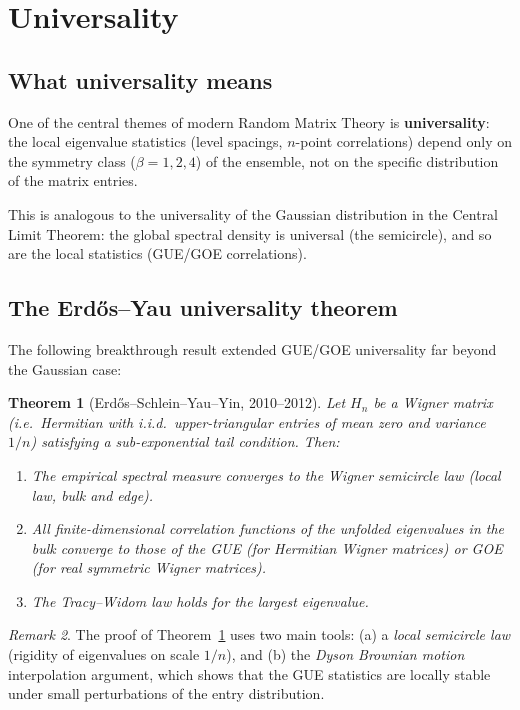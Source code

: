 \documentclass[12pt,a4paper]{amsart}
\newtheorem{theorem}{Theorem}[section]
\theoremstyle{definition}
\theoremstyle{remark}
\newtheorem{remark}[theorem]{Remark}
\begin{document}
\section{Universality}
\label{sec:universality}

\subsection{What universality means}

One of the central themes of modern Random Matrix Theory is
\textbf{universality}: the local eigenvalue statistics (level spacings,
$n$-point correlations) depend only on the symmetry class ($\beta = 1, 2, 4$)
of the ensemble, not on the specific distribution of the matrix entries.

This is analogous to the universality of the Gaussian distribution in the
Central Limit Theorem: the global spectral density is universal
(the semicircle), and so are the local statistics (GUE/GOE correlations).

\subsection{The Erd\H{o}s--Yau universality theorem}

The following breakthrough result extended GUE/GOE universality far beyond
the Gaussian case:

\begin{theorem}[Erd\H{o}s--Schlein--Yau--Yin, 2010--2012]
\label{thm:universality}
Let $H_n$ be a Wigner matrix (i.e.\ Hermitian with i.i.d.\ upper-triangular
entries of mean zero and variance $1/n$) satisfying a sub-exponential tail
condition. Then:
\begin{enumerate}[label=(\roman*)]
  \item The empirical spectral measure converges to the Wigner semicircle law
    (local law, bulk and edge).
  \item All finite-dimensional correlation functions of the unfolded eigenvalues
    in the bulk converge to those of the GUE (for Hermitian Wigner matrices)
    or GOE (for real symmetric Wigner matrices).
  \item The Tracy--Widom law holds for the largest eigenvalue.
\end{enumerate}
\end{theorem}

\begin{remark}
The proof of Theorem~\ref{thm:universality} uses two main tools:
(a) a \emph{local semicircle law} (rigidity of eigenvalues on scale $1/n$),
and (b) the \emph{Dyson Brownian motion} interpolation argument, which shows
that the GUE statistics are locally stable under small perturbations of the
entry distribution.
\end{remark}
\end{document}
